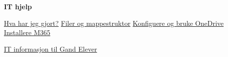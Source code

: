 

\centerline{\bf IT hjelp} \bigskip 

\href{https://forms.office.com/Pages/DesignPageV2.aspx?origin=NeoPortalPage&subpage=design&id=H75sAsQBmEalZi_EPr7HMR3QcgyZmWZGpIMQU6JKCTZUM1dDVVM5WEZHU1A4N0dFRTJMSlpCRThVRi4u}{Hva har jeg gjort?}
\vskip 1cm
\href{https://rfka-my.sharepoint.com/:v:/g/personal/sverre_wilhelmsen_skole_rogfk_no/EfmqE3Pj3mNFlTp-p-owBP8Biqz8LDh1uGrZO5f0QOXu0g?e=z03gZU}{Filer og mappestruktor}
\vskip 1cm
\href{https://vimeo.com/850876389}{Konfiguere og bruke OneDrive}
\vskip 1cm
\href{https://vimeo.com/850863231}{Installere M365}

\vskip 1cm
\href{https://rfka.sharepoint.com/:b:/r/sites/GANDElevinformasjon/Delte%20dokumenter/IT/Infoskriv%20til%20%20VG1%20(2024).pdf?csf=1&web=1&e=NsSipR}{IT informasjon til Gand Elever}
\vskip 1cm
\vskip 1cm
\vskip 1cm


\vskip 1cm
\eject


